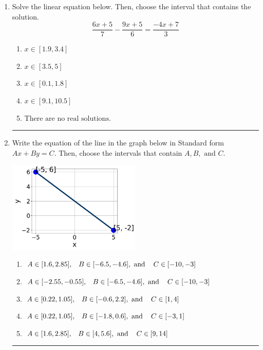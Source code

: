 \documentclass[14pt]{extbook}
\newcommand{\litem}[1]{\item#1\hspace*{-1cm}\rule{\textwidth}{0.4pt}}
\begin{document}
\begin{enumerate}
{\begin{enumerate}[label=\Alph*.]
\end{enumerate} }
\litem{
Solve the linear equation below. Then, choose the interval that contains the solution.\[ \frac{6x + 5}{7} - \frac{9x + 5}{6} = \frac{-4x + 7}{3} \]\begin{enumerate}[label=\Alph*.]
\item \( x \in [1.9, 3.4] \)
\item \( x \in [3.5, 5] \)
\item \( x \in [0.1, 1.8] \)
\item \( x \in [9.1, 10.5] \)
\item \( \text{There are no real solutions.} \)

\end{enumerate} }
\litem{
Write the equation of the line in the graph below in Standard form $Ax+By=C$. Then, choose the intervals that contain $A, B, \text{ and } C$.
\begin{center}
    \includegraphics[width=0.5\textwidth]{../Figures/linearGraphToStandardCopyA.png}
\end{center}
\begin{enumerate}[label=\Alph*.]
\item \( A \in [1.6, 2.85], \hspace{3mm} B \in [-6.5, -4.6], \text{ and } \hspace{3mm} C \in [-10, -3] \)
\item \( A \in [-2.55, -0.55], \hspace{3mm} B \in [-6.5, -4.6], \text{ and } \hspace{3mm} C \in [-10, -3] \)
\item \( A \in [0.22, 1.05], \hspace{3mm} B \in [-0.6, 2.2], \text{ and } \hspace{3mm} C \in [1, 4] \)
\item \( A \in [0.22, 1.05], \hspace{3mm} B \in [-1.8, 0.6], \text{ and } \hspace{3mm} C \in [-3, 1] \)
\item \( A \in [1.6, 2.85], \hspace{3mm} B \in [4, 5.6], \text{ and } \hspace{3mm} C \in [9, 14] \)


\end{enumerate}}
\end{enumerate}
\end{document}
